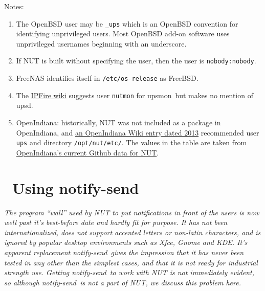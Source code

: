 \documentclass[12pt]{article}
\newlength{\headersep}\setlength{\headersep}{3mm}
\newcommand{\Hsep}{\hspace{\headersep}}
\newcommand{\newcolumn}{\vfill\eject}
\newcommand{\upsd}{\mbox{\textcolor{UPSDCOLOUR}{upsd}}}
\newcommand{\upsmon}{\mbox{\textcolor{MONCOLOUR}{upsmon}}}
\newcommand{\notifysend}{\mbox{\textcolor{NOTIFYCOLOUR}{notify-send}}}
\newcommand{\ol}{\begin{enumerate}%
   \setlength{\itemsep}{0em}}
\newcommand{\eol}{\end{enumerate}}
\newcommand{\li}{\item}                 %
\begin{document}
Notes: 
\ol

\li The OpenBSD user may be \texttt{\_ups} which is an OpenBSD
convention for identifying unprivileged users. Most OpenBSD add-on
software uses unprivileged usernames beginning with an underscore.

\li If NUT is built without specifying the user, then the user is
\texttt{nobody:nobody}.

\li FreeNAS identifies itself in \texttt{/etc/os-release} as FreeBSD.

\li The \href{https://wiki.ipfire.org/addons/nut}{IPFire wiki} suggests user
\texttt{nutmon} for \upsmon\ but makes no mention of \upsd.

\li OpenIndiana: historically, NUT was not included as a package in
OpenIndiana, and
\href{https://wiki.openindiana.org/oi/Network+UPS+Tools+(NUT)+and+NUT+Monitor}%
     {an OpenIndiana Wiki entry dated 2013} recommended user \texttt{ups} and
     directory \texttt{/opt/nut/etc/}.  The values in the table are taken from
     \href{https://github.com/OpenIndiana/oi-userland/blob/oi/hipster/components/sysutils/nut/files}%
          {OpenIndiana's current Github data for NUT}.

\eol

\vspace*{\fill}

\begin{center}
\end{center}

\vspace*{\fill}

\newcolumn
\section{\Hsep\ Using \notifysend}\label{section:notifysend}

\textsl{The program ``wall'' used by NUT to put notifications in front of the
  users is now well past it's best-before date and hardly fit for purpose. It
  has not been internationalized, does not support accented letters or
  non-latin characters, and is ignored by popular desktop environments such as
  Xfce, Gnome and KDE.  It's apparent replacement \notifysend\ gives the
  impression that it has never been tested in any other than the simplest
  cases, and that it is not ready for industrial strength use.  Getting
  \notifysend\ to work with NUT is not immediately evident, so although
  \notifysend\ is not a part of NUT, we discuss this problem here.}
\end{document}
